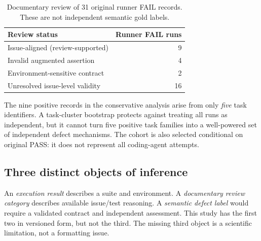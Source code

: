 \begin{table}[t]
\caption{Documentary review of 31 original runner FAIL records. These are not independent semantic gold labels.}
\label{tab:reviewdispositions}
\centering
\begin{tabular}{lr}
\toprule
Review status & Runner FAIL runs\\
\midrule
Issue-aligned (review-supported) &9\\
Invalid augmented assertion &4\\
Environment-sensitive contract &2\\
Unresolved issue-level validity &16\\
\bottomrule
\end{tabular}
\end{table}

The nine positive records in the conservative analysis arise from only \emph{five} task identifiers. A task-cluster bootstrap protects against treating all runs as independent, but it cannot turn five positive task families into a well-powered set of independent defect mechanisms. The cohort is also selected conditional on original PASS: it does not represent all coding-agent attempts.

\subsection{Three distinct objects of inference}
An \emph{execution result} describes a suite and environment. A \emph{documentary review category} describes available issue/test reasoning. A \emph{semantic defect label} would require a validated contract and independent assessment. This study has the first two in versioned form, but not the third. The missing third object is a scientific limitation, not a formatting issue.
